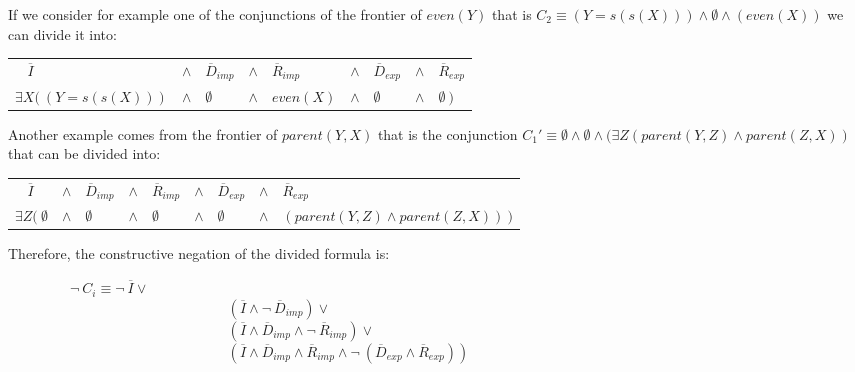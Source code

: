 \documentclass{tlp}
\begin{document}
If we consider for example one of the conjunctions of the frontier of
$even(Y)$ that is $C_2 \equiv ( Y=s(s(X)) ) \wedge \emptyset \wedge ( even(X)
)$ we can divide it into:

\begin{center}
\begin{tabular}{lllllllll}
$~~~~\overline{I}$ & $\wedge$ & 
        $\overline{D}_{imp}$ & $\wedge$ & $\overline{R}_{imp}$ & $
        \wedge$ &
        $\overline{D}_{exp}$ & $ \wedge$ & $ \overline{R}_{exp}$ \\
$\exists X (~ ( Y=s(s(X)) )$ & 
       $\wedge$ & $\emptyset$ & $ \wedge$ & $ even(X)$ & $  \wedge$
        & $ \emptyset$ & $ \wedge$ & $\emptyset~)$ \\
\end{tabular}
\end{center}

Another example comes from the frontier of $parent(Y,X)$ that is the
conjunction $C_1' \equiv \emptyset \wedge \emptyset \wedge (\exists Z
(parent(Y,Z) \wedge parent(Z,X) )$ that can be divided into:
\begin{center}
\begin{tabular}{lllllllll}
$~~~~\overline{I}$ & $ \wedge$ &
        $\overline{D}_{imp}$ & $ \wedge$ & $ \overline{R}_{imp}$ &
        $\wedge$ & $\overline{D}_{exp}$ & $ \wedge$ & $ \overline{R}_{exp}$  \\
        $\exists Z (~ \emptyset$ & $ \wedge$ & $ \emptyset$ & $ \wedge$ & 
$\emptyset$ & $ \wedge$ & $ \emptyset$ & $ \wedge $ & $ (parent(Y,Z) \wedge parent(Z,X) ) ~)$ 
\end{tabular}
\end{center}


Therefore, the constructive negation of the divided formula is:

\noindent
$~~~~~~~~~~~~~~~~~~~~\neg~C_i \equiv \neg~\overline{I} \vee $ \\
$~~~~~~~~~~~~~~~~~~~~~~~~~~~~~~~~~~~~ ~~~~~~~~~~~~~~~~~~~~~~~~~~~~~~~~~~~(\overline{I} \wedge \neg~\overline{D}_{imp}) \vee  $ \\
$~~~~~~~~~~~~~~~~~~~~~~~~~~~~~~~~~~~~ ~~~~~~~~~~~~~~~~~~~~~~~~~~~~~~~~~~~(\overline{I} \wedge \overline{D}_{imp}  \wedge \neg~\overline{R}_{imp}) \vee $ \\
$~~~~~~~~~~~~~~~~~~~~~~~~~~~~~~~~~~~~ ~~~~~~~~~~~~~~~~~~~~~~~~~~~~~~~~~~~( \overline{I} \wedge \overline{D}_{imp} \wedge \overline{R}_{imp} \wedge \neg~(\overline{D}_{exp} \wedge \overline{R}_{exp})) $ \\
\end{document}
